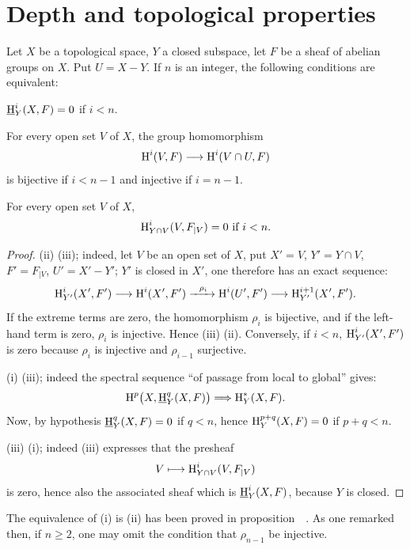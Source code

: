 \section{Depth and topological properties} \label{III.3}

\begin{lemma} \label{III.3.1}
Let $X$ be a topological space, $Y$ a closed subspace, let $F$ be a sheaf of abelian groups on $X$. Put $U=X- Y$. If $n$ is an integer, the following conditions are equivalent:
\begin{enumeratei}
\item
$\operatorname{\underline{H}}_Y^i (X, F)=0$ if $i<n$.
\item
For every open set $V$ of $X$, the group homomorphism
\[
\H^i(V, F) \to \H^i(V\cap U, F)
\]
is bijective if $i<n-1$ and injective if $i=n-1$.

\item
For every open set $V$ of $X$,
\[
\operatorname{H}_{Y\cap V}^i(V, F_{\mid V})=0 \text{ if } i<n.
\]
\end{enumeratei}
\end{lemma}

\begin{proof}
(ii) \SSI (iii); indeed, let $V$ be an open set of $X$, put $X'=V$, $Y'=Y\cap V$, $F'=F_{\mid V}$, $U'=X'- Y'$; $Y'$ is closed in $X'$, one therefore has an exact sequence:
\[
\H_{Y'}^i(X', F') \to \H^i(X', F') \lto{\rho_i} \H^i(U', F') \to \H_{Y'}^{i+1}(X', F').
\]
If the extreme terms are zero, the homomorphism $\rho_i$ is bijective, and if the left-hand term is zero, $\rho_i$ is injective. Hence (iii) \ALORS (ii). Conversely, if $i<n$, $\operatorname{H}_{Y'}^i(X', F')$ is zero because $\rho_i$ is injective and $\rho_{i-1}$ surjective.

(i) \ALORS (iii); indeed the spectral sequence ``of passage from local to global'' gives:
\[
\H^p\bigl(X, \SheafH_Y^q(X, F)\bigr) \To \H_Y^*(X, F).
\]
Now, by hypothesis $\operatorname{\underline{H}}_Y^q(X, F) =0$ if $q<n$, hence $\operatorname{H}_Y^{p+q} (X, F) = 0$ if $p+q<n$.

(iii) \ALORS (i); indeed (iii) expresses that the presheaf
\[
V \mto \H_{Y\cap V}^i(V, F_{\mid V})
\]
is zero, hence also the associated sheaf which is $\operatorname{\underline{H}}_Y^i (X, F)$, because $Y$ is closed.
\skipqed
\end{proof}

\begin{remark} \label{III.3.2}
The equivalence of (i) is (ii) has been proved in proposition~~. As one remarked then, if $n\geq 2$, one may omit the condition that $\rho_{n-1}$ be injective.
\end{remark}

